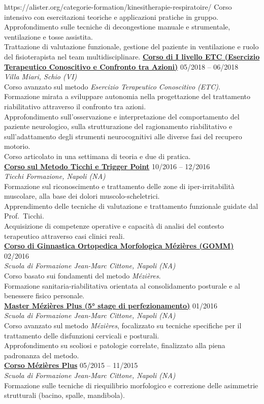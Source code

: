 \documentclass[a4paper]{article}
\newcommand{\voice}[5]{\href{#4}{\textbf{#1}} \hfill #2 \\ \textit{#3} \\ {\small #5} \vspace{0.2cm} \\}
\begin{document}
    {https://alister.org/categorie-formation/kinesitherapie-respiratoire/}
    {
    Corso intensivo con esercitazioni teoriche e applicazioni pratiche in gruppo.\\
    Approfondimento sulle tecniche di decongestione manuale e strumentale, ventilazione e tosse assistita.\\
    Trattazione di valutazione funzionale, gestione del paziente in ventilazione e ruolo del fisioterapista nel team multidisciplinare.
    }
    \voice{Corso di I livello ETC (Esercizio Terapeutico Conoscitivo e Confronto tra Azioni)}
    {05/2018 -- 06/2018}
    {Villa Miari, Schio (VI)}
    {https://riabilitazioneneurocognitiva.it/wp-content/uploads/2023/01/Progr-note-organ-corso-di-1-liv-2023-24.pdf}
    {
    Corso avanzato sul metodo \emph{Esercizio Terapeutico Conoscitivo (ETC)}.\\
    Formazione mirata a sviluppare autonomia nella progettazione del trattamento riabilitativo attraverso il confronto tra azioni.\\
    Approfondimento sull’osservazione e interpretazione del comportamento del paziente neurologico, sulla strutturazione del ragionamento riabilitativo e sull’adattamento degli strumenti neurocognitivi alle diverse fasi del recupero motorio.\\
    Corso articolato in una settimana di teoria e due di pratica.
    }
    \voice{Corso sul Metodo Ticchi e Trigger Point}
    {10/2016 -- 12/2016}
    {Ticchi Formazione, Napoli (NA)}
    {https://www.metodoticchi.com/}
    {
    Formazione sul riconoscimento e trattamento delle zone di iper-irritabilità muscolare, alla base dei dolori muscolo-scheletrici.\\
    Apprendimento delle tecniche di valutazione e trattamento funzionale guidate dal Prof.\ Ticchi.\\
    Acquisizione di competenze operative e capacità di analisi del contesto terapeutico attraverso casi clinici reali.
    }
    \voice{Corso di Ginnastica Ortopedica Morfologica Mézières (GOMM)}
    {02/2016}
    {Scuola di Formazione Jean-Marc Cittone, Napoli (NA)}
    {https://mezieresacademy.com/}
    {
    Corso basato sui fondamenti del metodo \emph{Mézières}.\\
    Formazione sanitaria-riabilitativa orientata al consolidamento posturale e al benessere fisico personale.
    }
    \voice{Master Mézières Plus (5° stage di perfezionamento)}
    {01/2016}
    {Scuola di Formazione Jean-Marc Cittone, Napoli (NA)}
    {https://mezieresacademy.com/}
    {
    Corso avanzato sul metodo \emph{Mézières}, focalizzato su tecniche specifiche per il trattamento delle disfunzioni cervicali e posturali.\\
    Approfondimento su scoliosi e patologie correlate, finalizzato alla piena padronanza del metodo.
    }
    \voice{Corso Mézières Plus}
    {05/2015 -- 11/2015}
    {Scuola di Formazione Jean-Marc Cittone, Napoli (NA)}
    {https://mezieresacademy.com/}{
    Formazione sulle tecniche di riequilibrio morfologico e correzione delle asimmetrie strutturali (bacino, spalle, mandibola).
    }
\end{document}

